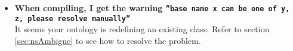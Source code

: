 \begin{itemize}
\item \textbf{When compiling, I get the warning \texttt{''base name x can be one of y, z, please resolve manually''}}\\
  It seems your ontology is redefining an existing class. Refer to
  section \ref{sec:nsAmbigue} to see how to resolve the problem.

\end{itemize}
